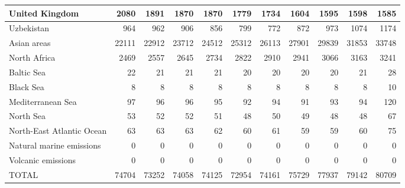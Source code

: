 \begin{table}
\begin{tabular}{|l|r|r|r|r|r|r|r|r|r|r|}
                United Kingdom&   2080&   1891&   1870&   1870&   1779&   1734&   1604&   1595&   1598&   1585\\\hline
                    Uzbekistan&    964&    962&    906&    856&    799&    772&    872&    973&   1074&   1174\\\hline
                   Asian areas&  22111&  22912&  23712&  24512&  25312&  26113&  27901&  29839&  31853&  33748\\\hline
                  North Africa&   2469&   2557&   2645&   2734&   2822&   2910&   2941&   3066&   3163&   3241\\\hline
                    Baltic Sea&     22&     21&     21&     21&     20&     20&     20&     20&     21&     28\\\hline
                     Black Sea&      8&      8&      8&      8&      8&      8&      8&      8&      8&     10\\\hline
             Mediterranean Sea&     97&     96&     96&     95&     92&     94&     91&     93&     94&    120\\\hline
                     North Sea&     53&     52&     52&     51&     48&     50&     49&     48&     48&     67\\\hline
     North-East Atlantic Ocean&     63&     63&     63&     62&     60&     61&     59&     59&     60&     75\\\hline
      Natural marine emissions&      0&      0&      0&      0&      0&      0&      0&      0&      0&      0\\\hline
            Volcanic emissions&      0&      0&      0&      0&      0&      0&      0&      0&      0&      0\\\hline\hline
                         TOTAL&  74704&  73252&  74058&  74125&  72954&  74161&  75729&  77937&  79142&  80709\\\hline
 \end{tabular}
 \end{table}
 
